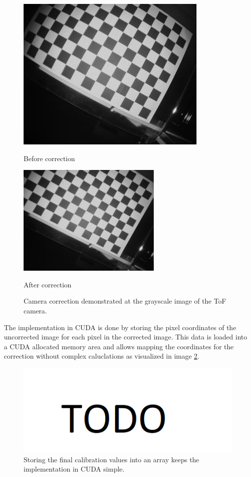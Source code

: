 \begin{figure}[H]
    \centering
    \begin{minipage}[b]{0.45\textwidth}
      \includegraphics[scale=0.70]{images/camcalib_source.jpg}
      \caption{Before correction}
      \label{fig:camCalibBefore} 
    \end{minipage} %
    \begin{minipage}[b]{0.45\textwidth}
      \includegraphics[scale=0.70]{images/camcalib_result.png} 
      \caption{After correction}
      \label{fig:camCalibAfter} 
    \end{minipage}
    \caption{Camera correction demonstrated at the grayscale image of the ToF camera.}
    \label{fig.camCalib}
  \end{figure}
The implementation in CUDA is done by storing the pixel coordinates of the uncorrected image for each pixel in the corrected image. This data is loaded into a CUDA allocated memory area and allows mapping the coordinates for the correction without complex caluclations as visualized in image \ref{im:CudaCamCalib}.
\begin{figure}[H]
    \centering
    \includegraphics[width=1.0\textwidth]{images/todo.png}
    \caption{Storing the final calibration values into an array keeps the implementation in CUDA simple.}
    \label{im:CudaCamCalib}
\end{figure}